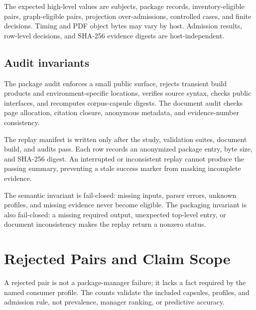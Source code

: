 \documentclass[10pt,conference]{IEEEtran}
\begin{document}
The expected high-level values are \SubjectCount{} subjects, \PackageCount{} package records, \InventoryEligible{} inventory-eligible pairs, \GraphEligible{} graph-eligible pairs, \ProjectionOver{} projection over-admissions, \ControlledCases{} controlled cases, and \ProofDecisions{} finite decisions. Timing and PDF object bytes may vary by host. Admission results, row-level decisions, and SHA-256 evidence digests are host-independent.

\subsection{Audit invariants}
The package audit enforces a small public surface, rejects transient build products and environment-specific locations, verifies source syntax, checks public interfaces, and recomputes corpus-capsule digests. The document audit checks page allocation, citation closure, anonymous metadata, and evidence-number consistency.

The replay manifest is written only after the study, validation suites, document build, and audits pass. Each row records an anonymized package entry, byte size, and SHA-256 digest. An interrupted or inconsistent replay cannot produce the passing summary, preventing a stale success marker from masking incomplete evidence.

The semantic invariant is fail-closed: missing inputs, parser errors, unknown profiles, and missing evidence never become eligible. The packaging invariant is also fail-closed: a missing required output, unexpected top-level entry, or document inconsistency makes the replay return a nonzero status.


\section{Rejected Pairs and Claim Scope}
A rejected pair is not a package-manager failure; it lacks a fact required by the named consumer profile. The counts validate the included capsules, profiles, and admission rule, not prevalence, manager ranking, or predictive accuracy.
\end{document}
